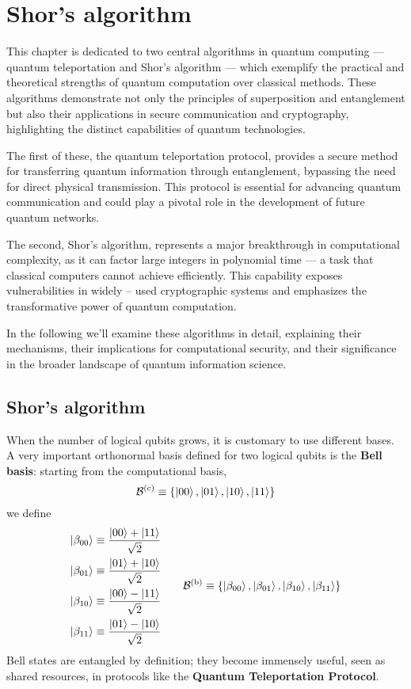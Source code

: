 \chapter{Shor's algorithm}\chaptertoc{}\label{chap:shor's algorithm}


This chapter is dedicated to two central algorithms in quantum computing — quantum teleportation and Shor's algorithm — which exemplify the practical and theoretical strengths of quantum computation over classical methods. These algorithms demonstrate not only the principles of superposition and entanglement but also their applications in secure communication and cryptography, highlighting the distinct capabilities of quantum technologies.

The first of these, the quantum teleportation protocol, provides a secure method for transferring quantum information through entanglement, bypassing the need for direct physical transmission. This protocol is essential for advancing quantum communication and could play a pivotal role in the development of future quantum networks.

The second, Shor's algorithm, represents a major breakthrough in computational complexity, as it can factor large integers in polynomial time — a task that classical computers cannot achieve efficiently. This capability exposes vulnerabilities in widely -- used cryptographic systems and emphasizes the transformative power of quantum computation.

In the following we'll examine these algorithms in detail, explaining their mechanisms, their implications for computational security, and their significance in the broader landscape of quantum information science.


\section{Shor's algorithm}\label{sec:shor algorithm}

When the number of logical qubits grows, it is customary to use different bases. A very important orthonormal basis defined for two logical qubits is the \textbf{Bell basis}: starting from the computational basis,
\[
	\mathcal{B}^{(\mathrm{c})} \equiv \lbrace \ket{00},\ket{01},\ket{10},\ket{11} \rbrace
\]
we define
\[
	\begin{aligned}
		\ket{\beta_{00}} &\equiv \frac{\ket{00}+\ket{11}}{\sqrt{2}} \\
		\ket{\beta_{01}} &\equiv \frac{\ket{01}+\ket{10}}{\sqrt{2}} \\
		\ket{\beta_{10}} &\equiv \frac{\ket{00}-\ket{11}}{\sqrt{2}} \\
		\ket{\beta_{11}} &\equiv \frac{\ket{01}-\ket{10}}{\sqrt{2}} \\
	\end{aligned}
	\qquad
	\mathcal{B}^{(\mathrm{b})} \equiv \lbrace \ket{\beta_{00}},\ket{\beta_{01}},\ket{\beta_{10}},\ket{\beta_{11}} \rbrace
\]
Bell states are entangled by definition; they become immensely useful, seen as shared resources, in protocols like the \textbf{Quantum Teleportation Protocol}.

